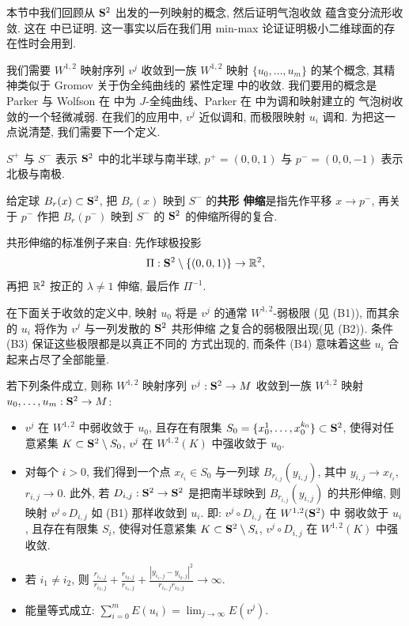 本节中我们回顾从 $\mathbf{S}^2$ 出发的一列映射的概念, 然后证明气泡收敛
蕴含变分流形收敛. 这在 \cite{CM27} 中已证明. 这一事实以后在我们用
min-max 论证证明极小二维球面的存在性时会用到.

我们需要 $W^{1,2}$ 映射序列 $v^j$ 收敛到一族 $W^{1,2}$ 映射
$\{u_0,\dots,u_m\}$ 的某个概念, 其精神类似于 Gromov 关于伪全纯曲线的
紧性定理 \cite{G} 中的收敛. 我们要用的概念是 Parker 与 Wolfson 在
\cite{PkW} 中为 $J$-全纯曲线、Parker 在 \cite{Pk} 中为调和映射建立的
气泡树收敛的一个轻微减弱. 在我们的应用中, $v^j$ 近似调和, 而极限映射
$u_i$ 调和. 为把这一点说清楚, 我们需要下一个定义.

$S^+$ 与 $S^-$ 表示 $\mathbf{S}^2$ 中的北半球与南半球, $p^+=(0,0,1)$ 与
$p^-=(0,0,-1)$ 表示北极与南极.

\begin{definition}
\label{def:3.25}
给定球 $B_r(x)\subset\mathbf{S}^2$, 把 $B_r(x)$ 映到 $S^-$ 的\textbf{共形
伸缩}是指先作平移 $x\to p^-$, 再关于 $p^-$ 作把 $B_r(p^-)$ 映到 $S^-$
的 $\mathbf{S}^2$ 的伸缩所得的复合.
\end{definition}

共形伸缩的标准例子来自: 先作球极投影
\begin{equation}
\Pi:\mathbf{S}^2\setminus\{(0,0,1)\}\to\mathbb{R}^2,
\label{eq:3.106}
\end{equation}
再把 $\mathbb{R}^2$ 按正的 $\lambda\neq1$ 伸缩, 最后作 $\Pi^{-1}$.

在下面关于收敛的定义中, 映射 $u_0$ 将是 $v^j$ 的通常 $W^{1,2}$-弱极限
(见 (B1)), 而其余的 $u_i$ 将作为 $v^j$ 与一列发散的 $\mathbf{S}^2$ 共形伸缩
之复合的弱极限出现(见 (B2)). 条件 (B3) 保证这些极限都是以真正不同的
方式出现的, 而条件 (B4) 意味着这些 $u_i$ 合起来占尽了全部能量.

\begin{definition}[气泡收敛]
\label{def:3.26}
若下列条件成立, 则称 $W^{1,2}$ 映射序列 $v^j:\mathbf{S}^2\to M$ 收敛到一族
$W^{1,2}$ 映射 $u_0,\dots,u_m:\mathbf{S}^2\to M$:
\begin{itemize}[leftmargin=3.6em,labelwidth=3.4em,align=left,itemsep=3pt]
\item[\textbf{(B1)}] $v^j$ 在 $W^{1,2}$ 中弱收敛于 $u_0$, 且存在有限集
 $S_0=\{x_0^1,\dots,x_0^{k_0}\}\subset\mathbf{S}^2$, 使得对任意紧集
 $K\subset\mathbf{S}^2\setminus S_0$, $v^j$ 在 $W^{1,2}(K)$ 中强收敛于 $u_0$.
\item[\textbf{(B2)}] 对每个 $i>0$, 我们得到一个点
 $x_{\ell_i}\in S_0$ 与一列球 $B_{r_{i,j}}(y_{i,j})$, 其中
 $y_{i,j}\to x_{\ell_i}$, $r_{i,j}\to0$. 此外, 若
 $D_{i,j}:\mathbf{S}^2\to\mathbf{S}^2$ 是把南半球映到
 $B_{r_{i,j}}(y_{i,j})$ 的共形伸缩, 则映射 $v^j\circ D_{i,j}$ 如
 (B1) 那样收敛到 $u_i$. 即: $v^j\circ D_{i,j}$ 在 $W^{1,2}(\mathbf{S}^2)$ 中
 弱收敛于 $u_i$, 且存在有限集 $S_i$, 使得对任意紧集
 $K\subset\mathbf{S}^2\setminus S_i$, $v^j\circ D_{i,j}$ 在
 $W^{1,2}(K)$ 中强收敛.
\item[\textbf{(B3)}] 若 $i_1\neq i_2$, 则
 $\displaystyle\frac{r_{i_1,j}}{r_{i_2,j}}+\frac{r_{i_2,j}}{r_{i_1,j}}
 +\frac{|y_{i_1,j}-y_{i_2,j}|^2}{r_{i_1,j}r_{i_2,j}}\to\infty$.
\item[\textbf{(B4)}] 能量等式成立:
 $\displaystyle\sum_{i=0}^mE(u_i)=\lim_{j\to\infty}E(v^j)$.
\end{itemize}
\end{definition}

